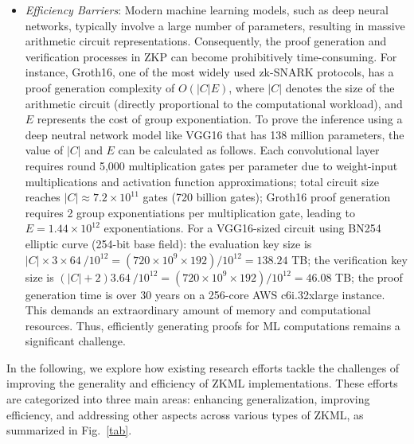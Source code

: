 \documentclass[journal]{IEEEtran}
\begin{document}
\begin{itemize}
    
    \item \emph{Efficiency Barriers}: Modern machine learning models, such as deep neural networks, typically involve a large number of parameters, resulting in massive arithmetic circuit representations. Consequently, the proof generation and verification processes in ZKP can become prohibitively time-consuming. For instance, Groth16, one of the most widely used zk-SNARK protocols, has a proof generation complexity of \(O(|C|E)\), where \(|C|\) denotes the size of the arithmetic circuit (directly proportional to the computational workload), and \(E\) represents the cost of group exponentiation. To prove the inference using a deep neutral network model like VGG16 that has 138 million parameters, the value of  \(|C|\) and \(E\) can be calculated as follows. Each convolutional layer requires round 5,000 multiplication gates per parameter due to weight-input multiplications and activation function approximations; total circuit size reaches $|C| \approx 7.2 \times 10^{11}$ gates (720 billion gates); Groth16 proof generation requires 2 group exponentiations per multiplication gate, leading to  $E=1.44 \times 10^{12}$ exponentiations. For a VGG16-sized circuit using BN254 elliptic curve (254-bit base field): the evaluation key size is $|C|\times 3\times 64~ /10^{12} =(720 \times 10^9 \times 192)/ 10^{12} = 138.24$  TB; the verification key size is $(|C|+2)3.64~ /10^{12} =(720 \times 10^9 \times 192)/ 10^{12} = 46.08$ TB; the proof generation time is over 30 years on a 256-core AWS c6i.32xlarge instance. This demands an extraordinary amount of memory and computational resources. Thus, efficiently generating proofs for ML computations remains a significant challenge.
    
\end{itemize}


In the following, we explore how existing research efforts tackle the challenges of improving the generality and efficiency of ZKML implementations. These efforts are categorized into three main areas: enhancing generalization, improving efficiency, and addressing other aspects across various types of ZKML, as summarized in Fig.~\ref{tab}.





\end{document}
